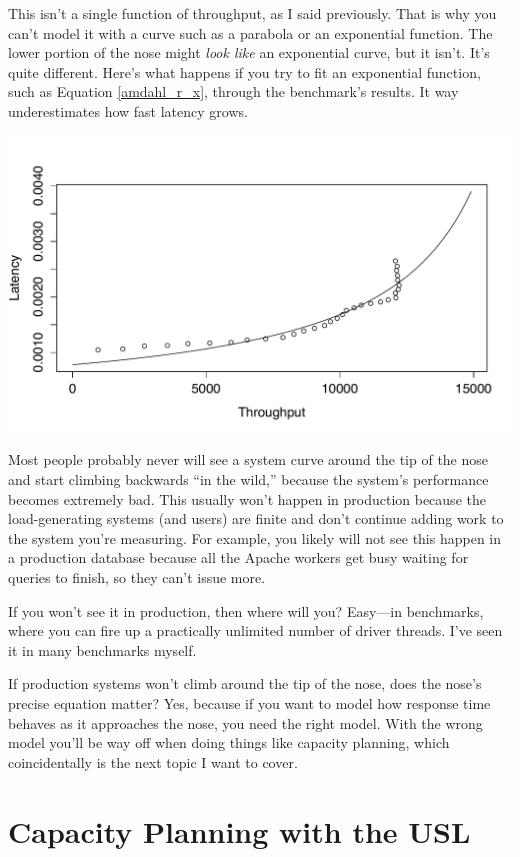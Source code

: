 \documentclass{vivid_layout}
\begin{document}
This isn't a single function of throughput, as I said previously. That is why
you can't model it with a curve such as a parabola or an exponential function.
The lower portion of the nose might {\itshape look like} an exponential curve,
but it isn't. It's quite different.  Here's what happens if you try to fit an
exponential function, such as Equation \ref{amdahl_r_x},
through the benchmark's results. It way underestimates how fast latency grows.
\begin{center}
\includegraphics[width=.85\linewidth]{scalability/cisco-x-v-r-amdahl}
\end{center}

Most people probably never will see a system curve around the tip of the nose
and start climbing backwards ``in the wild,'' because the system's performance
becomes extremely bad.  This usually won't happen in production because the
load-generating systems (and users) are finite and don't continue adding work to
the system you're measuring. For example, you likely will not see this happen in
a production database because all the Apache workers get busy waiting for
queries to finish, so they can't issue more.

If you won't see it in production, then where will you? Easy---in benchmarks,
where you can fire up a practically unlimited number of driver threads. I've
seen it in many benchmarks myself.

If production systems won't climb around the tip of the nose, does the nose's
precise equation matter? Yes, because if you want to model how response time
behaves as it approaches the nose, you need the right model. With the wrong
model you'll be way off when doing things like capacity planning, which
coincidentally is the next topic I want to cover.

\section{Capacity Planning with the USL}
\end{document}
